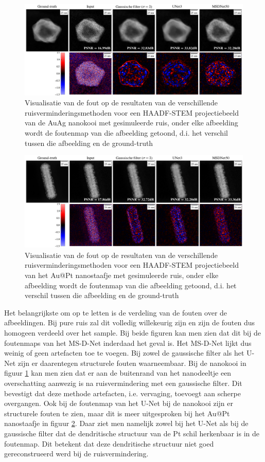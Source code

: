 \documentclass{report}
\begin{document}
\begin{figure}[h!]
	\centering
	\includegraphics[width=15cm]{images/nets/error_vis_cage.png}
	\caption{Visualisatie van de fout op de resultaten van de verschillende ruisverminderingsmethoden voor een HAADF-STEM projectiebeeld van de AuAg nanokooi met gesimuleerde ruis, onder elke afbeelding wordt de foutenmap van die afbeelding getoond, d.i. het verschil tussen die afbeelding en de ground-truth}
	\label{fig:nets_error_vis_cage}
\end{figure}
\begin{figure}[h!]
	\centering
	\includegraphics[width=15cm]{images/nets/error_vis_rod.png}
	\caption{Visualisatie van de fout op de resultaten van de verschillende ruisverminderingsmethoden voor een HAADF-STEM projectiebeeld van het Au@Pt nanostaafje met gesimuleerde ruis, onder elke afbeelding wordt de foutenmap van die afbeelding getoond, d.i. het verschil tussen die afbeelding en de ground-truth}
	\label{fig:nets_error_vis_rod}
\end{figure}
Het belangrijkste om op te letten is de verdeling van de fouten over de afbeeldingen. Bij pure ruis zal dit volledig willekeurig zijn en zijn de fouten dus homogeen verdeeld over het sample. Bij beide figuren kan men zien dat dit bij de foutenmaps van het MS-D-Net inderdaad het geval is. Het MS-D-Net lijkt dus weinig of geen artefacten toe te voegen. Bij zowel de gaussische filter als het U-Net zijn er daarentegen structurele fouten waarneembaar. Bij de nanokooi in figuur \ref{fig:nets_error_vis_cage} kan men zien dat er aan de buitenrand van het nanodeeltje een overschatting aanwezig is na ruisvermindering met een gaussische filter. Dit bevestigt dat deze methode artefacten, i.e. vervaging, toevoegt aan scherpe overgangen. Ook bij de foutenmap van het U-Net bij de nanokooi zijn er structurele fouten te zien, maar dit is meer uitgesproken bij het Au@Pt nanostaafje in figuur \ref{fig:nets_error_vis_rod}. Daar ziet men namelijk zowel bij het U-Net als bij de gaussische filter dat de dendritische structuur van de Pt schil herkenbaar is in de foutenmap. Dit betekent dat deze dendritische structuur niet goed gereconstrueerd werd bij de ruisvermindering.
\end{document}

